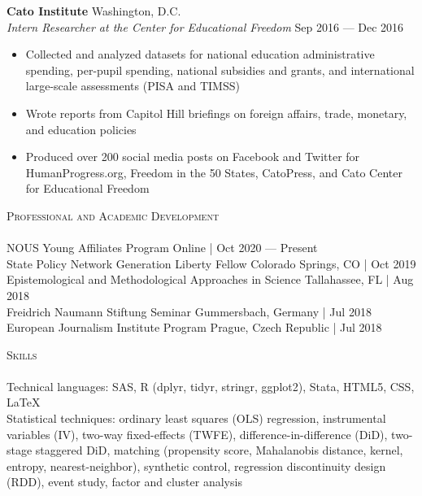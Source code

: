 \documentclass[a4paper,11pt]{article}
\newcommand{\lineunder} {
    \vspace*{-8pt} \\
    \hspace*{-18pt} \hrulefill \\
}
\newcommand{\header} [1] {
    {\hspace*{-18pt}\vspace*{6pt} \textsc{\large{#1}}}
    \vspace*{-6pt} \lineunder
}
\begin{document}
\textbf{Cato Institute} \hfill Washington, D.C.\\
\textit{Intern Researcher at the Center for Educational Freedom} \hfill Sep 2016 --- Dec 2016\\
\begin{itemize}[noitemsep,nolistsep]
    \item Collected and analyzed datasets for national education administrative spending, per-pupil spending, national subsidies and grants, and international large-scale assessments (PISA and TIMSS)
    \item Wrote reports from Capitol Hill briefings on foreign affairs, trade, monetary, and education policies
    \item Produced over 200 social media posts on Facebook and Twitter for HumanProgress.org, Freedom in the 50 States, CatoPress, and Cato Center for Educational Freedom
\end{itemize}
\vspace{1mm}
\header{Professional and Academic Development}

NOUS Young Affiliates Program \hfill Online | Oct 2020 --- Present \\

State Policy Network Generation Liberty Fellow \hfill Colorado Springs, CO | Oct 2019 \\

Epistemological and Methodological Approaches in Science \hfill Tallahassee, FL | Aug 2018\\

Freidrich Naumann Stiftung Seminar \hfill Gummersbach, Germany | Jul 2018\\

European Journalism Institute Program \hfill Prague, Czech Republic | Jul 2018 \\

\vspace{1mm}
\header{Skills}
Technical languages: SAS, R (dplyr, tidyr, stringr, ggplot2), Stata, HTML5, CSS, \LaTeX \\

Statistical techniques: ordinary least squares (OLS) regression, instrumental variables (IV), two-way fixed-effects (TWFE), difference-in-difference (DiD), two-stage staggered DiD, matching (propensity score, Mahalanobis distance, kernel, entropy, nearest-neighbor), synthetic control, regression discontinuity design (RDD), event study, factor and cluster analysis
\end{document}
